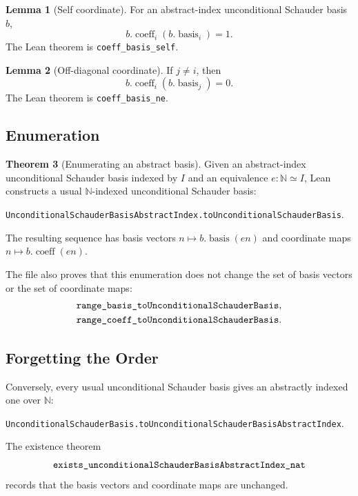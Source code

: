 \documentclass[12pt,a4paper]{article}
\theoremstyle{definition}
\newtheorem{theorem}{Theorem}[section]
\newtheorem{lemma}[theorem]{Lemma}
\newcommand{\Nat}{\mathbb{N}}
\begin{document}
\begin{lemma}[Self coordinate]
For an abstract-index unconditional Schauder basis $b$,
\[
  b.\operatorname{coeff}_i(b.\operatorname{basis}_i)=1.
\]
The Lean theorem is \verb|coeff_basis_self|.
\end{lemma}

\begin{lemma}[Off-diagonal coordinate]
If $j\neq i$, then
\[
  b.\operatorname{coeff}_i(b.\operatorname{basis}_j)=0.
\]
The Lean theorem is \verb|coeff_basis_ne|.
\end{lemma}

\subsection{Enumeration}

\begin{theorem}[Enumerating an abstract basis]
Given an abstract-index unconditional Schauder basis indexed by $I$ and an
equivalence $e : \Nat \simeq I$, Lean constructs a usual $\Nat$-indexed
unconditional Schauder basis:
\begin{center}
\verb|UnconditionalSchauderBasisAbstractIndex.toUnconditionalSchauderBasis|.
\end{center}
The resulting sequence has basis vectors $n\mapsto b.\operatorname{basis}(e n)$
and coordinate maps $n\mapsto b.\operatorname{coeff}(e n)$.
\end{theorem}

The file also proves that this enumeration does not change the set of basis
vectors or the set of coordinate maps:
\[
\begin{aligned}
  &\verb|range_basis_toUnconditionalSchauderBasis|,\\
  &\verb|range_coeff_toUnconditionalSchauderBasis|.
\end{aligned}
\]

\subsection{Forgetting the Order}

Conversely, every usual unconditional Schauder basis gives an abstractly
indexed one over $\Nat$:
\begin{center}
\verb|UnconditionalSchauderBasis.toUnconditionalSchauderBasisAbstractIndex|.
\end{center}
The existence theorem
\[
  \verb|exists_unconditionalSchauderBasisAbstractIndex_nat|
\]
records that the basis vectors and coordinate maps are unchanged.
\end{document}
